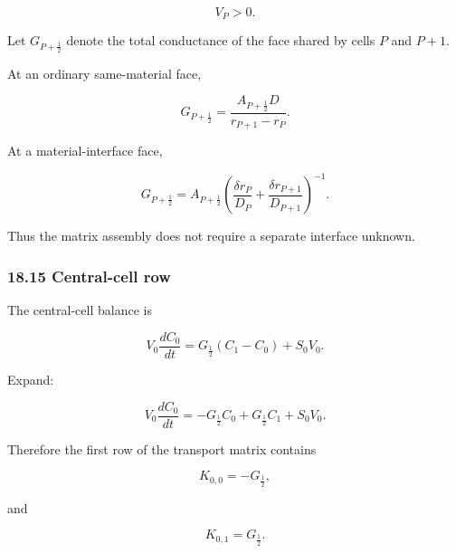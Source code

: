 \documentclass[11pt,a4paper]{article}
\begin{document}
\begin{equation}
V_P>0.
\tag{TRISO-FV-235}
\label{eq:triso-fv-235}
\end{equation}

Let $G_{P+\frac12}$ denote the total conductance of the face shared by cells $P$ and $P+1$.

At an ordinary same-material face,

\begin{equation}
G_{P+\frac12}
=
\frac{
A_{P+\frac12}D
}{
r_{P+1}-r_P
}.
\tag{TRISO-FV-236}
\label{eq:triso-fv-236}
\end{equation}

At a material-interface face,

\begin{equation}
\boxed{
G_{P+\frac12}
=
A_{P+\frac12}
\left(
\frac{\delta r_P}{D_P}
+
\frac{\delta r_{P+1}}{D_{P+1}}
\right)^{-1}.
}
\tag{TRISO-FV-237}
\label{eq:triso-fv-237}
\end{equation}

Thus the matrix assembly does not require a separate interface unknown.

\subsubsection*{18.15 Central-cell row}

The central-cell balance is

\begin{equation}
V_0\frac{dC_0}{dt}
=
G_{\frac12}(C_1-C_0)
+
S_0V_0.
\tag{TRISO-FV-238}
\label{eq:triso-fv-238}
\end{equation}

Expand:

\begin{equation}
V_0\frac{dC_0}{dt}
=
-G_{\frac12}C_0
+
G_{\frac12}C_1
+
S_0V_0.
\tag{TRISO-FV-239}
\label{eq:triso-fv-239}
\end{equation}

Therefore the first row of the transport matrix contains

\begin{equation}
K_{0,0}
=
-G_{\frac12},
\tag{TRISO-FV-240}
\label{eq:triso-fv-240}
\end{equation}

and

\begin{equation}
K_{0,1}
=
G_{\frac12}.
\tag{TRISO-FV-241}
\label{eq:triso-fv-241}
\end{equation}
\end{document}
